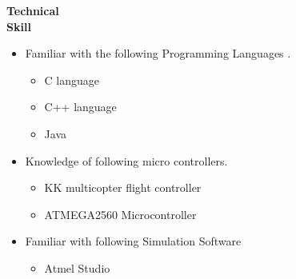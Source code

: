 \documentclass{article}
\begin{document}
	\begin{flushleft}
	   	\vspace{1.15in}
	   	\textbf{Technical  \\ Skill}
	   	\begin{itemize}
	   		\vspace{-0.45in}
	   		\addtolength{\itemindent}{1.359in}
	   		\item  Familiar with the following Programming Languages .
	   		{\begin{itemize}
	   				\addtolength{\itemindent}{1.359in}
	   				\item C language
	   				\item C++ language
	   				\item Java 	
	   			\end{itemize}
	   		}  
	   		\item Knowledge of following micro controllers.
	   		{\begin{itemize}
	   				\addtolength{\itemindent}{1.359in}
	   				\item KK multicopter flight controller
	   				\item ATMEGA2560 Microcontroller	
	   			\end{itemize}
	   		}  
	   		
	   		\item Familiar with following Simulation Software
	   		{\begin{itemize}
	   				\addtolength{\itemindent}{1.359in}
	   				\item Atmel Studio 	
	   			\end{itemize}
	   		} 
	   	\end{itemize}
	   \end{flushleft}
	
\end{document}
